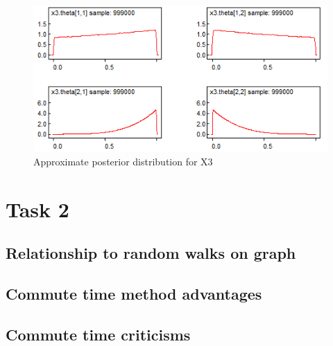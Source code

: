 \documentclass[12pt]{article} %
\begin{document}
\begin{figure}[h!]
  \centering
  \includegraphics[width=\linewidth]{bugs_graphs/x3_2.png}
  \caption{Approximate posterior distribution for X3}
  \label{fig:X3_2 Posterior}
\end{figure}

\clearpage

\section{Task 2}
\subsection{Relationship to random walks on graph}

\subsection{Commute time method advantages}

\subsection{Commute time criticisms}

\printbibliography 
\end{document}
